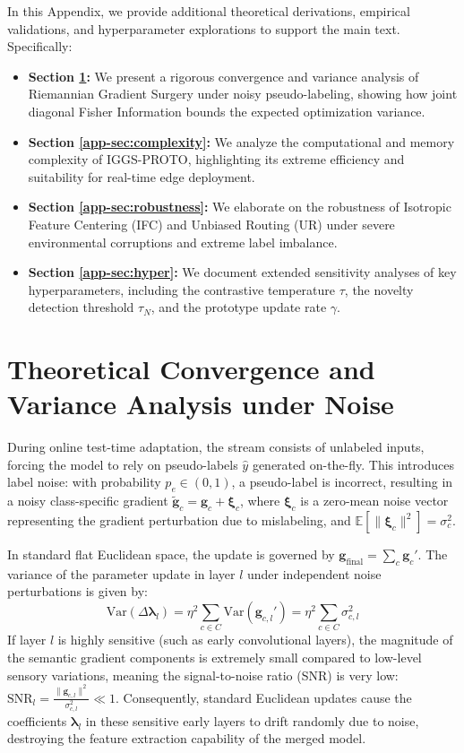 \documentclass{article}
\theoremstyle{plain}
\theoremstyle{definition}
\theoremstyle{remark}
\begin{document}
In this Appendix, we provide additional theoretical derivations, empirical validations, and hyperparameter explorations to support the main text. Specifically:
\begin{itemize}
    \item \textbf{Section \ref{app-sec:theory}:} We present a rigorous convergence and variance analysis of Riemannian Gradient Surgery under noisy pseudo-labeling, showing how joint diagonal Fisher Information bounds the expected optimization variance.
    \item \textbf{Section \ref{app-sec:complexity}:} We analyze the computational and memory complexity of IGGS-PROTO, highlighting its extreme efficiency and suitability for real-time edge deployment.
    \item \textbf{Section \ref{app-sec:robustness}:} We elaborate on the robustness of Isotropic Feature Centering (IFC) and Unbiased Routing (UR) under severe environmental corruptions and extreme label imbalance.
    \item \textbf{Section \ref{app-sec:hyper}:} We document extended sensitivity analyses of key hyperparameters, including the contrastive temperature $\tau$, the novelty detection threshold $\tau_N$, and the prototype update rate $\gamma$.
\end{itemize}

\section{Theoretical Convergence and Variance Analysis under Noise}
\label{app-sec:theory}
During online test-time adaptation, the stream consists of unlabeled inputs, forcing the model to rely on pseudo-labels $\hat{y}$ generated on-the-fly. This introduces label noise: with probability $p_e \in (0,1)$, a pseudo-label is incorrect, resulting in a noisy class-specific gradient $\tilde{\mathbf{g}}_c = \mathbf{g}_c + \boldsymbol{\xi}_c$, where $\boldsymbol{\xi}_c$ is a zero-mean noise vector representing the gradient perturbation due to mislabeling, and $\mathbb{E}[\|\boldsymbol{\xi}_c\|^2] = \sigma_c^2$.

In standard flat Euclidean space, the update is governed by $\mathbf{g}_{\text{final}} = \sum_c \mathbf{g}_c'$. The variance of the parameter update in layer $l$ under independent noise perturbations is given by:
\begin{equation}
    \text{Var}(\Delta \boldsymbol{\lambda}_l) = \eta^2 \sum_{c \in C} \text{Var}(\mathbf{g}_{c,l}') = \eta^2 \sum_{c \in C} \sigma_{c,l}^2
\end{equation}
If layer $l$ is highly sensitive (such as early convolutional layers), the magnitude of the semantic gradient components is extremely small compared to low-level sensory variations, meaning the signal-to-noise ratio (SNR) is very low: $\text{SNR}_l = \frac{\|\mathbf{g}_{c,l}\|^2}{\sigma_{c,l}^2} \ll 1$. Consequently, standard Euclidean updates cause the coefficients $\boldsymbol{\lambda}_l$ in these sensitive early layers to drift randomly due to noise, destroying the feature extraction capability of the merged model.
\end{document}
